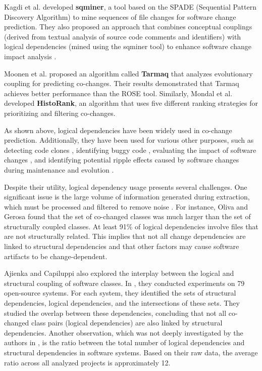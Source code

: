 Kagdi et al. \cite{article-Kagdi-commit, msr-kagdi} developed \textbf{sqminer}, a tool based on the SPADE (Sequential Pattern Discovery Algorithm) to mine sequences of file changes for software change prediction. They also proposed an approach that combines conceptual couplings (derived from textual analysis of source code comments and identifiers) with logical dependencies (mined using the sqminer tool) to enhance software change impact analysis \cite{article-Kagdi-commit}.

Moonen et al. \cite{Moonen-commit, article-Moonen, 7476643} proposed an algorithm called \textbf{Tarmaq} that analyzes evolutionary coupling for predicting co-changes. Their results demonstrated that Tarmaq achieves better performance than the ROSE tool. Similarly, Mondal et al. \cite{HistoRank} developed \textbf{HistoRank}, an algorithm that uses five different ranking strategies for prioritizing and filtering co-changes.

As shown above, logical dependencies have been widely used in co-change prediction. Additionally, they have been used for various other purposes, such as detecting code clones \cite{Mandal-clones}, identifying buggy code \cite{buggy-code}, evaluating the impact of software changes \cite{1553643}, and identifying potential ripple effects caused by software changes during maintenance and evolution \cite{DBLP:conf/issre/OlivaG15, Oliva:2011:ISL:2067853.2068086}.

Despite their utility, logical dependency usage presents several challenges. One significant issue is the large volume of information generated during extraction, which must be processed and filtered to remove noise \cite{Coupling-Lanza, articleEvolution, Shtern:2012:CMS:2332427.2332428}. For instance, Oliva and Gerosa \cite{Oliva:2011:ISL:2067853.2068086} found that the set of co-changed classes was much larger than the set of structurally coupled classes. At least 91\% of logical dependencies involve files that are not structurally related. This implies that not all change dependencies are linked to structural dependencies and that other factors may cause software artifacts to be change-dependent.

Ajienka and Capiluppi also explored the interplay between the logical and structural coupling of software classes. In \cite{DBLP:journals/jss/AjienkaC17, DBLP:journals/ese/AjienkaCC18}, they conducted experiments on 79 open-source systems. For each system, they identified the sets of structural dependencies, logical dependencies, and the intersections of these sets. They studied the overlap between these dependencies, concluding that not all co-changed class pairs (logical dependencies) are also linked by structural dependencies. Another observation, which was not deeply investigated by the authors in \cite{DBLP:journals/jss/AjienkaC17, DBLP:journals/ese/AjienkaCC18}, is the ratio between the total number of logical dependencies and structural dependencies in software systems. Based on their raw data, the average ratio across all analyzed projects is approximately 12.

